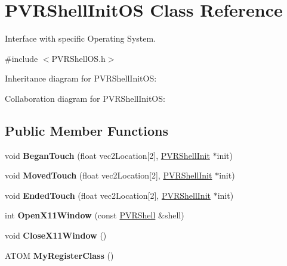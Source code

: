 \hypertarget{class_p_v_r_shell_init_o_s}{\section{P\+V\+R\+Shell\+Init\+O\+S Class Reference}
\label{class_p_v_r_shell_init_o_s}
}


Interface with specific Operating System.  




{\ttfamily \#include $<$P\+V\+R\+Shell\+O\+S.\+h$>$}



Inheritance diagram for P\+V\+R\+Shell\+Init\+O\+S\+:


Collaboration diagram for P\+V\+R\+Shell\+Init\+O\+S\+:
\subsection*{Public Member Functions}
\begin{DoxyCompactItemize}
\item 
\hypertarget{class_p_v_r_shell_init_o_s_aa2acd766954c4f17509fe79d60e73abd}{void {\bfseries Began\+Touch} (float vec2\+Location\mbox{[}2\mbox{]}, \hyperlink{class_p_v_r_shell_init}{P\+V\+R\+Shell\+Init} $\ast$init)}\label{class_p_v_r_shell_init_o_s_aa2acd766954c4f17509fe79d60e73abd}

\item 
\hypertarget{class_p_v_r_shell_init_o_s_a304959959375b808a0ffcddb38974b51}{void {\bfseries Moved\+Touch} (float vec2\+Location\mbox{[}2\mbox{]}, \hyperlink{class_p_v_r_shell_init}{P\+V\+R\+Shell\+Init} $\ast$init)}\label{class_p_v_r_shell_init_o_s_a304959959375b808a0ffcddb38974b51}

\item 
\hypertarget{class_p_v_r_shell_init_o_s_aa8ed74352d0c3d1d96bc9fc2b8b36c47}{void {\bfseries Ended\+Touch} (float vec2\+Location\mbox{[}2\mbox{]}, \hyperlink{class_p_v_r_shell_init}{P\+V\+R\+Shell\+Init} $\ast$init)}\label{class_p_v_r_shell_init_o_s_aa8ed74352d0c3d1d96bc9fc2b8b36c47}

\item 
\hypertarget{class_p_v_r_shell_init_o_s_ad2f92057977d204c1ebffa51343a4b82}{int {\bfseries Open\+X11\+Window} (const \hyperlink{class_p_v_r_shell}{P\+V\+R\+Shell} \&shell)}\label{class_p_v_r_shell_init_o_s_ad2f92057977d204c1ebffa51343a4b82}

\item 
\hypertarget{class_p_v_r_shell_init_o_s_a8cf3d23c5e4148071531b4a414987294}{void {\bfseries Close\+X11\+Window} ()}\label{class_p_v_r_shell_init_o_s_a8cf3d23c5e4148071531b4a414987294}

\item 
\hypertarget{class_p_v_r_shell_init_o_s_ae6de935bb0d5fa2157f4351980d08eec}{A\+T\+O\+M {\bfseries My\+Register\+Class} ()}\label{class_p_v_r_shell_init_o_s_ae6de935bb0d5fa2157f4351980d08eec}

\end{DoxyCompactItemize}
